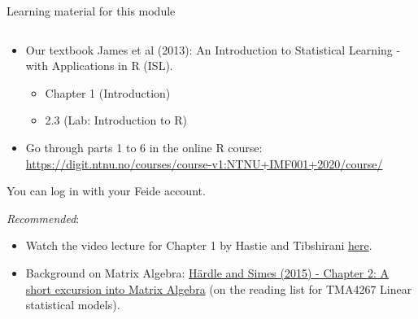 \documentclass[10pt,ignorenonframetext,]{beamer}
\providecommand{\tightlist}{%
  \setlength{\itemsep}{0pt}\setlength{\parskip}{0pt}}
\begin{document}
\begin{frame}

\begin{block}{Learning material for this module}

\(~\)

\begin{itemize}
\tightlist
\item
  Our textbook James et al (2013): An Introduction to Statistical
  Learning - with Applications in R (ISL).

  \begin{itemize}
  \tightlist
  \item
    Chapter 1 (Introduction)
  \item
    2.3 (Lab: Introduction to R)
  \end{itemize}
\end{itemize}

\vspace{2mm}

\begin{itemize}
\tightlist
\item
  Go through parts 1 to 6 in the online R course:
  \url{https://digit.ntnu.no/courses/course-v1:NTNU+IMF001+2020/course/}
\end{itemize}

You can log in with your Feide account.

\vspace{3mm}

\emph{Recommended}:

\vspace{2mm}

\begin{itemize}
\item
  Watch the video lecture for Chapter 1 by Hastie and Tibshirani
  \href{https://www.r-bloggers.com/in-depth-introduction-to-machine-learning-in-15-hours-of-expert-videos/}{here}.
\item
  Background on Matrix Algebra:
  \href{https://link.springer.com/chapter/10.1007/978-3-662-45171-7_2}{Härdle
  and Simes (2015) - Chapter 2: A short excursion into Matrix Algebra}
  (on the reading list for TMA4267 Linear statistical models).
\end{itemize}

\end{block}

\end{frame}
\end{document}
